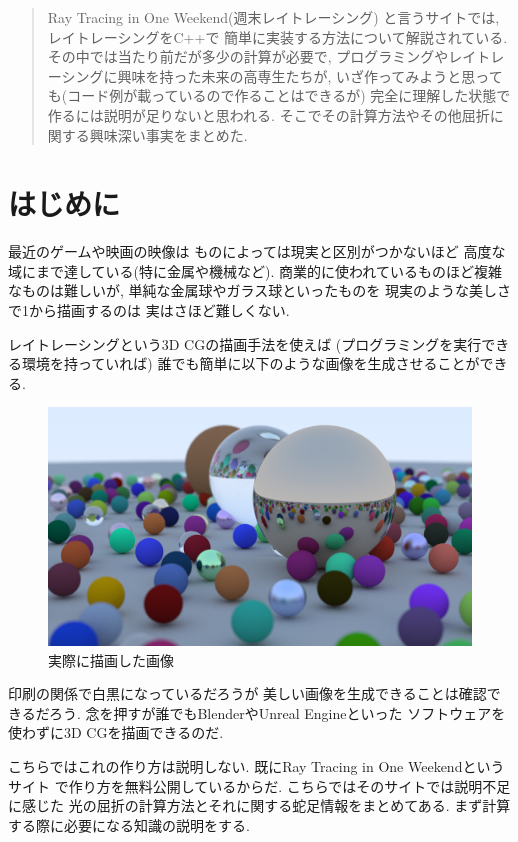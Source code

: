 \documentclass[a4paper, xelatex, ja=standard]{bxjsarticle}
\begin{document}
\maketitle
\begin{abstract}
Ray Tracing in One Weekend(週末レイトレーシング)
と言うサイトでは,
レイトレーシングをC++で
簡単に実装する方法について解説されている.
その中では当たり前だが多少の計算が必要で,
プログラミングやレイトレーシングに興味を持った未来の高専生たちが,
いざ作ってみようと思っても(コード例が載っているので作ることはできるが)
完全に理解した状態で作るには説明が足りないと思われる.
そこでその計算方法やその他屈折に関する興味深い事実をまとめた.
\end{abstract}

\section{はじめに}
最近のゲームや映画の映像は
ものによっては現実と区別がつかないほど
高度な域にまで達している(特に金属や機械など).
商業的に使われているものほど複雑なものは難しいが,
単純な金属球やガラス球といったものを
現実のような美しさで1から描画するのは
実はさほど難しくない.

レイトレーシングという3D CGの描画手法を使えば
(プログラミングを実行できる環境を持っていれば)
誰でも簡単に以下のような画像を生成させることができる.
\begin{figure}[b]
\centering
\includegraphics[scale=0.2]{img/example.png}
\caption{実際に描画した画像}
\label{}
\end{figure}
印刷の関係で白黒になっているだろうが
美しい画像を生成できることは確認できるだろう.
念を押すが誰でもBlenderやUnreal Engineといった
ソフトウェアを使わずに3D CGを描画できるのだ.

こちらではこれの作り方は説明しない.
既にRay Tracing in One Weekendというサイト
で作り方を無料公開しているからだ.
こちらではそのサイトでは説明不足に感じた
光の屈折の計算方法とそれに関する蛇足情報をまとめてある.
まず計算する際に必要になる知識の説明をする.
\end{document}
